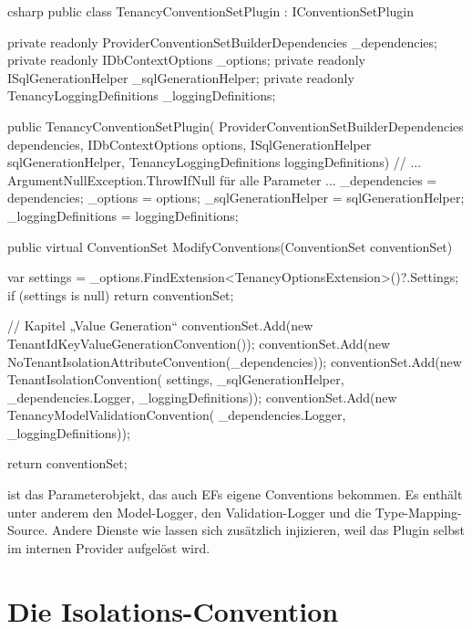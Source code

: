 \begin{sourcecode}{csharp}
public class TenancyConventionSetPlugin : IConventionSetPlugin
{
    private readonly ProviderConventionSetBuilderDependencies _dependencies;
    private readonly IDbContextOptions _options;
    private readonly ISqlGenerationHelper _sqlGenerationHelper;
    private readonly TenancyLoggingDefinitions _loggingDefinitions;

    public TenancyConventionSetPlugin(
        ProviderConventionSetBuilderDependencies dependencies,
        IDbContextOptions options,
        ISqlGenerationHelper sqlGenerationHelper,
        TenancyLoggingDefinitions loggingDefinitions)
    {
        // ... ArgumentNullException.ThrowIfNull für alle Parameter ...
        _dependencies = dependencies;
        _options = options;
        _sqlGenerationHelper = sqlGenerationHelper;
        _loggingDefinitions = loggingDefinitions;
    }

    public virtual ConventionSet ModifyConventions(ConventionSet conventionSet)
    {
        var settings = _options.FindExtension<TenancyOptionsExtension>()?.Settings;
        if (settings is null)
            return conventionSet;

        // Kapitel „Value Generation“
        conventionSet.Add(new TenantIdKeyValueGenerationConvention());
        conventionSet.Add(new NoTenantIsolationAttributeConvention(_dependencies));
        conventionSet.Add(new TenantIsolationConvention(
            settings, _sqlGenerationHelper, _dependencies.Logger, _loggingDefinitions));
        conventionSet.Add(new TenancyModelValidationConvention(
            _dependencies.Logger, _loggingDefinitions));

        return conventionSet;
    }
}
\end{sourcecode}

ist das Parameterobjekt, das auch EFs eigene Conventions bekommen. Es enthält unter anderem
den Model-Logger, den Validation-Logger und die Type-Mapping-Source. Andere Dienste wie
 lassen sich zusätzlich injizieren,
weil das Plugin selbst im internen Provider aufgelöst wird.

\section{Die Isolations-Convention}

